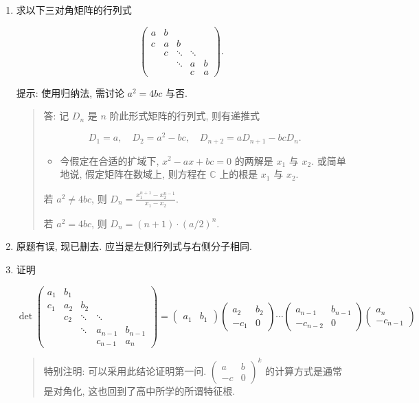 \documentclass[
]{ctexart}
\begin{document}
\begin{enumerate}
\def\labelenumi{\arabic{enumi}.}
\item
  求以下三对角矩阵的行列式

  \[\begin{pmatrix}
  a & b &  &  & \\
  c & a & b &  & \\
  & c & \ddots  & \ddots  & \\
  &  & \ddots  & a & b\\
  &  &  & c & a
  \end{pmatrix}.\]

  提示: 使用归纳法, 需讨论 \(a^2=4bc\) 与否.

  \begin{quote}
  答: 记 \(D_n\) 是 \(n\) 阶此形式矩阵的行列式, 则有递推式

  \[D_1=a,\quad D_2= a^2-bc,\quad D_{n+2}=aD_{n+1}-bc D_n .\]

  \begin{itemize}
  \item
    今假定在合适的扩域下, \(x^2-ax+bc=0\) 的两解是 \(x_1\) 与 \(x_2\).
    或简单地说, 假定矩阵在数域上, 则方程在 \(\mathbb C\) 上的根是
    \(x_1\) 与 \(x_2\).
  \end{itemize}

  若 \(a^2\neq 4bc\), 则 \(D_n = \frac{x_1^{n+1}-x_2^{n-1}}{x_1-x_2}\).

  若 \(a^2=4bc\), 则 \(D_n=(n+1)\cdot (a/2)^n\).
  \end{quote}
\item
  原题有误, 现已删去. 应当是左侧行列式与右侧分子相同.
\item
  证明

  \[\det\begin{pmatrix}
  a_{1} & b_{1} &  &  & \\
  c_{1} & a_{2} & b_{2} &  & \\
  & c_{2} & \ddots  & \ddots  & \\
  &  & \ddots  & a_{n-1} & b_{n-1}\\
  &  &  & c_{n-1} & a_{n}
  \end{pmatrix} =\begin{pmatrix}
  a_{1} & b_{1}
  \end{pmatrix}\begin{pmatrix}
  a_{2} & b_{2}\\
  -c_{1} & 0
  \end{pmatrix} \cdots \begin{pmatrix}
  a_{n-1} & b_{n-1}\\
  -c_{n-2} & 0
  \end{pmatrix}\begin{pmatrix}
  a_{n}\\
  -c_{n-1}
  \end{pmatrix}\]

  \begin{quote}
  特别注明: 可以采用此结论证明第一问.
  \(\begin{pmatrix}a&b\\-c&0\end{pmatrix}^k\) 的计算方式是通常是对角化,
  这也回到了高中所学的所谓特征根.
  \end{quote}
\end{enumerate}
\end{document}
